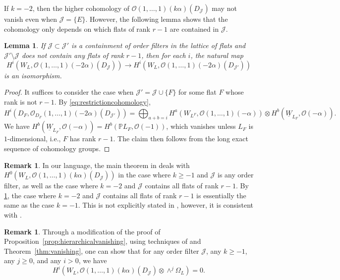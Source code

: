 \documentclass{amsart}
\newtheorem{lemma}[theorem]{Lemma}
\newcommand{\OO}{\mathcal{O}}
\theoremstyle{definition}
\newtheorem{remark}[theorem]{Remark}
\begin{document}
If $k = -2$, then the higher cohomology of $\mathcal{O}(1, \dotsc, 1)(k 
\alpha)(D_{\mathcal{J}})$ may not vanish even when $\mathcal{J} = 
\{E\}$. However, the following lemma shows that the cohomology only depends on which flats of rank $r-1$ are contained in $\mathcal{J}$. 
\begin{lemma}\label{lem:minus-two-case}
If $\mathcal{J} \subset \mathcal{J}'$ is a containment of order filters 
in the lattice of flats and $\mathcal{J}' \setminus \mathcal{J}$ does not contain any flats of 
rank $r-1$, then for each $i$, the natural map
\[
    H^i(W_L, \mathcal{O}(1, \dotsc, 1)(-2 \alpha)(D_{\mathcal{J}})) \to 
    H^i(W_L, \mathcal{O}(1, \dotsc, 1)(-2\alpha)(D_{\mathcal{J}'}))
\]
is an isomorphism. 
\end{lemma}
\begin{proof}
It suffices to consider the case when $\mathcal{J}' = \mathcal{J} \cup 
\{F\}$ for some flat $F$ whose rank is not $r-1$. By 
\eqref{eq:restrictioncohomology},
$$H^i(D_F, \mathcal{O}_{D_F}(1, \dotsc, 1)(-2 \alpha)(D_{\mathcal{J}'})) =  \bigoplus_{a + b = i}H^{a}(W_{L^F}, \mathcal{O}(1, \dotsc, 1)(-\alpha)) \otimes H^b(\underline{W}_{L_F}, \mathcal{O}(-\alpha)).$$
We have $H^b(\underline{W}_{L_F}, \mathcal{O}(-\alpha)) = H^b(\mathbb{P}L_F, \mathcal{O}(-1))$, which vanishes unless $L_F$ is $1$-dimensional, i.e., $F$ has rank $r-1$. The claim then follows from the long exact sequence of cohomology groups.
\end{proof}

\begin{remark}\label{rmk:minus-two-case}
    In our language, the main theorem in \cite{LenzHierarchical} deals 
    with $H^0(W_L, \OO(1, \ldots, 1)(k\alpha)(D_{\mathcal J}))$ in the 
    case where $k \geq -1$ and $\mathcal{J}$ is any order filter, as well as 
    the case where $k = -2$ and $\mathcal{J}$ 
    contains all flats of rank $r-1$. By 
    \cref{lem:minus-two-case}, the case where $k=-2$ and $\mathcal{J}$ 
    contains all flats of rank $r-1$ is essentially the same as the case $k=-1$. 
    This is not explicitly stated in \cite{LenzHierarchical}, however, it 
    is consistent with \cite[Remark 3.3, Remark 3.19, and Example 
    7.3]{LenzHierarchical}.
\end{remark}

\begin{remark}
Through a modification of the proof of Proposition~\ref{prop:hierarchicalvanishing}, using techniques of \cite{BergetFink} and Theorem~\ref{thm:vanishing}, one can show that for any order filter $\mathcal{J}$,  any $k \ge -1$, any $j \ge 0$, and any $i>0$, we have
$$H^i(W_L, \mathcal{O}(1, \dotsc, 1)(k\alpha)(D_{\mathcal{J}}) \otimes \wedge^j \Omega_L) = 0.$$
\end{remark}
\end{document}
